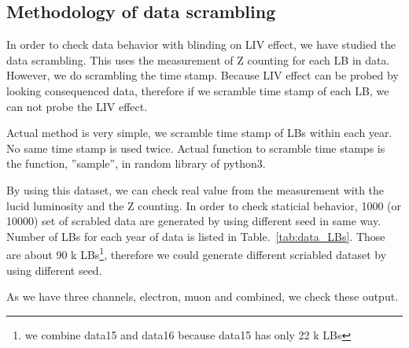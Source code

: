 \subsection{Methodology of data scrambling}
\label{lab:DataScrambling_method}

 In order to check data behavior with blinding on LIV effect, we have studied the data scrambling. 
This uses the measurement of Z counting for each LB in data. However, we do scrambling the time stamp. 
Because LIV effect can be probed by looking consequenced data, therefore if we scramble time stamp of each LB, 
we can not probe the LIV effect. 

 Actual method is very simple, we scramble time stamp of LBs within each year. No same time stamp is used twice. 
Actual function to scramble time stamps is the function, ''sample'', in random library of python3.

By using this dataset, we can check real value from the measurement with the lucid luminosity and the Z counting. 
In order to check staticial behavior, 1000 (or 10000) set of scrabled data are generated by using different seed in same way.
Number of LBs for each year of data is listed in Table.~\ref{tab:data_LBs}. 
Those are about 90 k LBs\footnote{we combine data15 and data16 because data15 has only 22 k LBs}, 
therefore we could generate different scriabled dataset by using different seed.

As we have three channels, electron, muon and combined, we check these output. 
